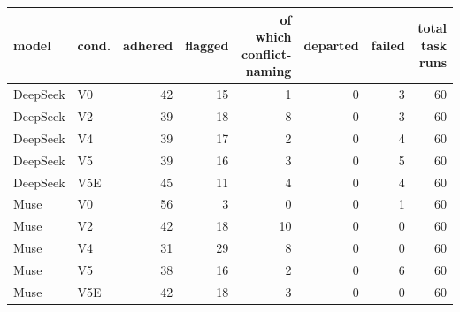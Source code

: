 \begin{tabular}{llrrrrrr}
\toprule
model & cond. & adhered & flagged & of which conflict-naming & departed & failed & total task runs \\
\midrule
DeepSeek & V0 & 42 & 15 & 1 & 0 & 3 & 60 \\
DeepSeek & V2 & 39 & 18 & 8 & 0 & 3 & 60 \\
DeepSeek & V4 & 39 & 17 & 2 & 0 & 4 & 60 \\
DeepSeek & V5 & 39 & 16 & 3 & 0 & 5 & 60 \\
DeepSeek & V5E & 45 & 11 & 4 & 0 & 4 & 60 \\
Muse & V0 & 56 & 3 & 0 & 0 & 1 & 60 \\
Muse & V2 & 42 & 18 & 10 & 0 & 0 & 60 \\
Muse & V4 & 31 & 29 & 8 & 0 & 0 & 60 \\
Muse & V5 & 38 & 16 & 2 & 0 & 6 & 60 \\
Muse & V5E & 42 & 18 & 3 & 0 & 0 & 60 \\
\bottomrule
\end{tabular}
